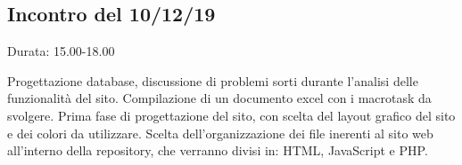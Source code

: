 \subsection{Incontro del 10/12/19}
    Durata: 15.00-18.00

    Progettazione database, discussione di problemi sorti durante l'analisi delle funzionalità del sito. Compilazione di un documento excel con i macrotask da svolgere.
    Prima fase di progettazione del sito, con scelta del layout grafico del sito e dei colori da utilizzare.
    Scelta dell'organizzazione dei file inerenti al sito web all'interno della repository, che verranno divisi in: HTML, JavaScript e PHP.
